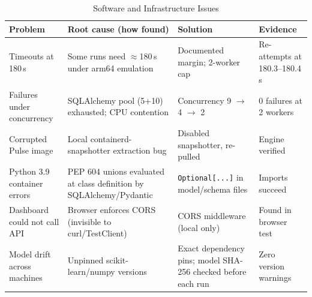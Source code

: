 \documentclass[conference]{IEEEtran}
\newcommand{\code}[1]{\texttt{\footnotesize #1}}
\begin{document}
\begin{table}[!t]
\centering
\caption{Software and Infrastructure Issues}
\label{tab:infra}
\footnotesize\sloppy
\begin{tabularx}{\textwidth}{@{}P{3.1cm}YYP{2.6cm}@{}}
\toprule
\textbf{Problem} & \textbf{Root cause (how found)} & \textbf{Solution} & \textbf{Evidence} \\
\midrule
Timeouts at 180\,s & Some runs need $\approx$180\,s under arm64 emulation & Documented margin; 2-worker cap & Re-attempts at 180.3--180.4\,s \\
Failures under concurrency & SQLAlchemy pool (5+10) exhausted; CPU contention & Concurrency 9 $\rightarrow$ 4 $\rightarrow$ 2 & 0 failures at 2 workers \\
Corrupted Pulse image & Local containerd-snapshotter extraction bug & Disabled snapshotter, re-pulled & Engine verified \\
Python 3.9 container errors & PEP 604 unions evaluated at class definition by SQLAlchemy/Pydantic & \code{Optional[...]} in model/schema files & Imports succeed \\
Dashboard could not call API & Browser enforces CORS (invisible to curl/TestClient) & CORS middleware (local only) & Found in browser test \\
Model drift across machines & Unpinned scikit-learn/numpy versions & Exact dependency pins; model SHA-256 checked before each run & Zero version warnings \\
\bottomrule
\end{tabularx}
\end{table}
\end{document}
